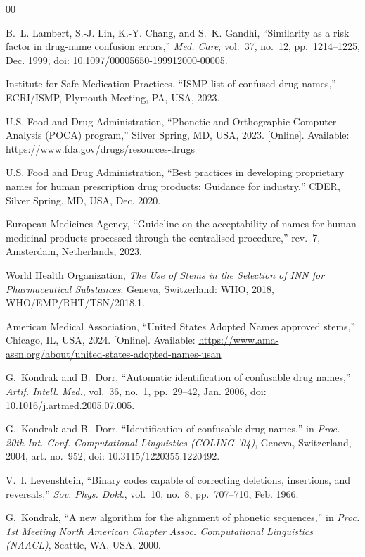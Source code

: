 \documentclass[conference]{IEEEtran}
\begin{document}
\begin{thebibliography}{00}

B.~L. Lambert, S.-J. Lin, K.-Y. Chang, and S.~K. Gandhi, ``Similarity as a risk
factor in drug-name confusion errors,'' \emph{Med. Care}, vol.~37, no.~12,
pp.~1214--1225, Dec. 1999, doi: 10.1097/00005650-199912000-00005.

Institute for Safe Medication Practices, ``ISMP list of confused drug names,''
ECRI/ISMP, Plymouth Meeting, PA, USA, 2023.

U.S. Food and Drug Administration, ``Phonetic and Orthographic Computer Analysis
(POCA) program,'' Silver Spring, MD, USA, 2023. [Online]. Available:
\url{https://www.fda.gov/drugs/resources-drugs}

U.S. Food and Drug Administration, ``Best practices in developing proprietary
names for human prescription drug products: Guidance for industry,'' CDER,
Silver Spring, MD, USA, Dec. 2020.

European Medicines Agency, ``Guideline on the acceptability of names for human
medicinal products processed through the centralised procedure,'' rev.~7,
Amsterdam, Netherlands, 2023.

World Health Organization, \emph{The Use of Stems in the Selection of INN for
Pharmaceutical Substances}. Geneva, Switzerland: WHO, 2018,
WHO/EMP/RHT/TSN/2018.1.

American Medical Association, ``United States Adopted Names approved stems,''
Chicago, IL, USA, 2024. [Online]. Available:
\url{https://www.ama-assn.org/about/united-states-adopted-names-usan}

G.~Kondrak and B.~Dorr, ``Automatic identification of confusable drug names,''
\emph{Artif. Intell. Med.}, vol.~36, no.~1, pp.~29--42, Jan.
2006, doi: 10.1016/j.artmed.2005.07.005.

G.~Kondrak and B.~Dorr, ``Identification of confusable drug names,'' in
\emph{Proc. 20th Int. Conf. Computational Linguistics (COLING '04)}, Geneva,
Switzerland, 2004, art. no.~952, doi: 10.3115/1220355.1220492.

V.~I. Levenshtein, ``Binary codes capable of correcting deletions, insertions,
and reversals,'' \emph{Sov. Phys. Dokl.}, vol.~10, no.~8, pp.~707--710,
Feb. 1966.

G.~Kondrak, ``A new algorithm for the alignment of phonetic sequences,'' in
\emph{Proc. 1st Meeting North American Chapter Assoc. Computational
Linguistics (NAACL)}, Seattle, WA, USA, 2000.


\end{thebibliography}
\end{document}

